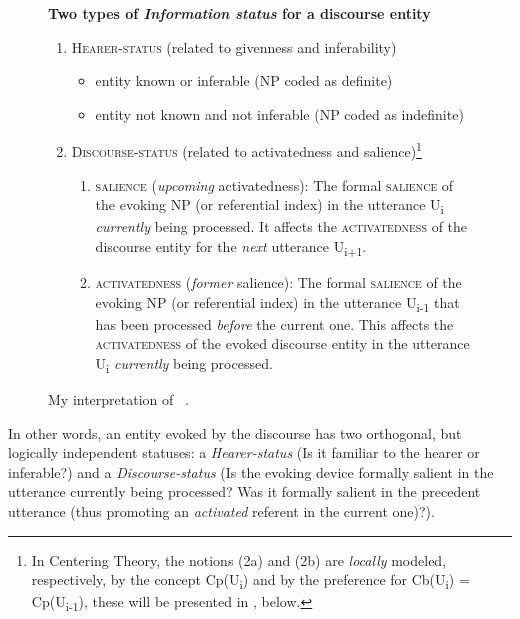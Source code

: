 \documentclass[output=paper
,modfonts
,nonflat]{langsci/langscibook}
\begin{document}
\begin{figure} 
	\centering 
	\caption{My interpretation of ~\citet{WalkerPrince1996}.} 
	\label{fig:pico:1}
	\textbf{Two types of \textit{Information status} for a discourse entity}
	\begin{enumerate}
		\item \textsc{Hearer-status} (related to givenness and inferability)
		\begin{itemize}
			\item entity known or inferable (NP coded as definite)
			\item entity not known and not inferable (NP coded as indefinite)
		\end{itemize}
		\item \textsc{Discourse-status} (related to activatedness and salience)\footnote{In Centering Theory, the notions (2a) and (2b) are \textit{locally} modeled, respectively, by the concept Cp(U\textsubscript{i}) and by the preference for Cb(U\textsubscript{i}) = Cp(U\textsubscript{i-1}), these will be presented in , below.}
		\begin{enumerate}
			\item \textsc{salience} (\textit{upcoming} activatedness): The formal \textsc{salience} of the evoking NP (or referential index) in the utterance U\textsubscript{i} \textit{currently} being processed. It affects the \textsc{activatedness} of the discourse entity for the \textit{next} utterance U\textsubscript{i+1}.
			\item \textsc{activatedness} (\textit{former} salience): The formal \textsc{salience} of the evoking NP (or referential index) in the utterance U\textsubscript{i-1} that has been processed \textit{before} the current one. This affects the \textsc{activatedness} of the evoked discourse entity in the utterance U\textsubscript{i} \textit{currently} being processed.
		\end{enumerate}
	\end{enumerate}
\end{figure} 

In other words, an entity evoked by the discourse has two orthogonal, but logically independent statuses: a \textit{Hearer-status} (Is it familiar to the hearer or inferable?) and a \textit{Discourse-status} (Is the evoking device formally salient in the utterance currently being processed? Was it formally salient in the precedent utterance (thus promoting an \textit{activated} referent in the current one)?).
\end{document}
